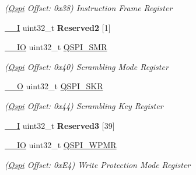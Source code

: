 \begin{DoxyCompactItemize}
\begin{DoxyCompactList}\small\item\em (\mbox{\hyperlink{structQspi}{Qspi}} Offset\+: 0x38) Instruction Frame Register \end{DoxyCompactList}\item 
\mbox{\label{structQspi_a3bc7238f5d61cd0d4f535fe7a0341225}} 
\mbox{\hyperlink{core__cm7_8h_af63697ed9952cc71e1225efe205f6cd3}{\+\_\+\+\_\+I}} uint32\+\_\+t {\bfseries Reserved2} \mbox{[}1\mbox{]}
\item 
\mbox{\label{structQspi_aa9d2e718e014af79dd4a8d0ce6851132}} 
\mbox{\hyperlink{core__cm7_8h_aec43007d9998a0a0e01faede4133d6be}{\+\_\+\+\_\+\+IO}} uint32\+\_\+t \mbox{\hyperlink{structQspi_aa9d2e718e014af79dd4a8d0ce6851132}{Q\+S\+P\+I\+\_\+\+S\+MR}}
\begin{DoxyCompactList}\small\item\em (\mbox{\hyperlink{structQspi}{Qspi}} Offset\+: 0x40) Scrambling Mode Register \end{DoxyCompactList}\item 
\mbox{\label{structQspi_a581d7496746e8c2db1e57e4c72690ea7}} 
\mbox{\hyperlink{core__cm7_8h_a7e25d9380f9ef903923964322e71f2f6}{\+\_\+\+\_\+O}} uint32\+\_\+t \mbox{\hyperlink{structQspi_a581d7496746e8c2db1e57e4c72690ea7}{Q\+S\+P\+I\+\_\+\+S\+KR}}
\begin{DoxyCompactList}\small\item\em (\mbox{\hyperlink{structQspi}{Qspi}} Offset\+: 0x44) Scrambling Key Register \end{DoxyCompactList}\item 
\mbox{\label{structQspi_af2256f13aa5fd92b83f673564f78e831}} 
\mbox{\hyperlink{core__cm7_8h_af63697ed9952cc71e1225efe205f6cd3}{\+\_\+\+\_\+I}} uint32\+\_\+t {\bfseries Reserved3} \mbox{[}39\mbox{]}
\item 
\mbox{\label{structQspi_a0f668a6fc6c510f696d6f0c3cd83aaf9}} 
\mbox{\hyperlink{core__cm7_8h_aec43007d9998a0a0e01faede4133d6be}{\+\_\+\+\_\+\+IO}} uint32\+\_\+t \mbox{\hyperlink{structQspi_a0f668a6fc6c510f696d6f0c3cd83aaf9}{Q\+S\+P\+I\+\_\+\+W\+P\+MR}}
\begin{DoxyCompactList}\small\item\em (\mbox{\hyperlink{structQspi}{Qspi}} Offset\+: 0x\+E4) Write Protection Mode Register \end{DoxyCompactList}\item 

\end{DoxyCompactItemize}
